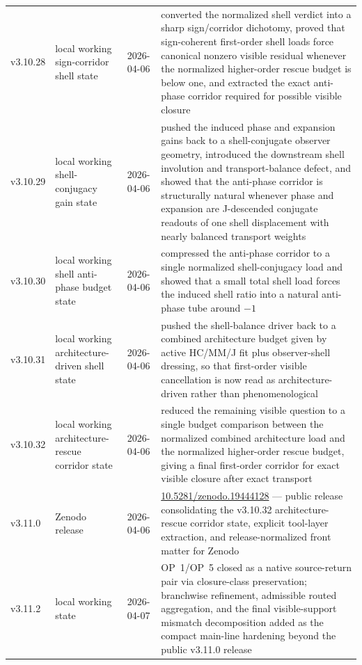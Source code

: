 {\begin{longtable}{|p{}|p{}|p{}|p{}|}
  v3.10.28 & local working sign-corridor shell state & 2026-04-06 & converted the normalized shell verdict into a sharp sign/corridor dichotomy, proved that sign-coherent first-order shell loads force canonical nonzero visible residual whenever the normalized higher-order rescue budget is below one, and extracted the exact anti-phase corridor required for possible visible closure \\
  v3.10.29 & local working shell-conjugacy gain state & 2026-04-06 & pushed the induced phase and expansion gains back to a shell-conjugate observer geometry, introduced the downstream shell involution and transport-balance defect, and showed that the anti-phase corridor is structurally natural whenever phase and expansion are J-descended conjugate readouts of one shell displacement with nearly balanced transport weights \\
\hline
v3.10.30 & local working shell anti-phase budget state & 2026-04-06 & compressed the anti-phase corridor to a single normalized shell-conjugacy load and showed that a small total shell load forces the induced shell ratio into a natural anti-phase tube around $-1$ \\
\hline
v3.10.31 & local working architecture-driven shell state & 2026-04-06 & pushed the shell-balance driver back to a combined architecture budget given by active HC/MM/J fit plus observer-shell dressing, so that first-order visible cancellation is now read as architecture-driven rather than phenomenological \\
\hline
v3.10.32 & local working architecture-rescue corridor state & 2026-04-06 & reduced the remaining visible question to a single budget comparison between the normalized combined architecture load and the normalized higher-order rescue budget, giving a final first-order corridor for exact visible closure after exact transport \\
\hline
v3.11.0 & Zenodo release & 2026-04-06 & \href{https://doi.org/10.5281/zenodo.19444128}{10.5281/zenodo.19444128} --- public release consolidating the v3.10.32 architecture-rescue corridor state, explicit tool-layer extraction, and release-normalized front matter for Zenodo \\
v3.11.2 & local working state & 2026-04-07 & OP~1/OP~5 closed as a native source-return pair via closure-class preservation; branchwise refinement, admissible routed aggregation, and the final visible-support mismatch decomposition added as the compact main-line hardening beyond the public v3.11.0 release  \\

\end{longtable}}
